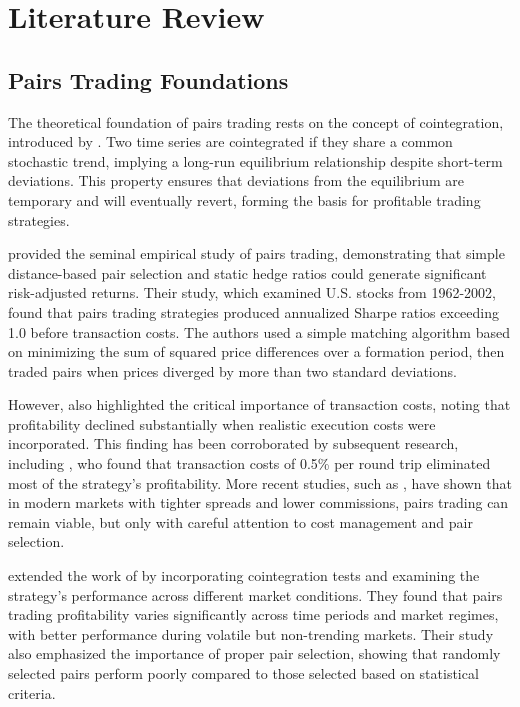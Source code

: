 \documentclass[12pt]{article}
\begin{document}
\section{Literature Review}

\subsection{Pairs Trading Foundations}

The theoretical foundation of pairs trading rests on the concept of cointegration, introduced by \citet{engle1987cointegration}. Two time series are cointegrated if they share a common stochastic trend, implying a long-run equilibrium relationship despite short-term deviations. This property ensures that deviations from the equilibrium are temporary and will eventually revert, forming the basis for profitable trading strategies.

\citet{gatev2006pairs} provided the seminal empirical study of pairs trading, demonstrating that simple distance-based pair selection and static hedge ratios could generate significant risk-adjusted returns. Their study, which examined U.S. stocks from 1962-2002, found that pairs trading strategies produced annualized Sharpe ratios exceeding 1.0 before transaction costs. The authors used a simple matching algorithm based on minimizing the sum of squared price differences over a formation period, then traded pairs when prices diverged by more than two standard deviations.

However, \citet{gatev2006pairs} also highlighted the critical importance of transaction costs, noting that profitability declined substantially when realistic execution costs were incorporated. This finding has been corroborated by subsequent research, including \citet{do2006pairs}, who found that transaction costs of 0.5\% per round trip eliminated most of the strategy's profitability. More recent studies, such as \citet{rad2016pairs}, have shown that in modern markets with tighter spreads and lower commissions, pairs trading can remain viable, but only with careful attention to cost management and pair selection.

\citet{do2006pairs} extended the work of \citet{gatev2006pairs} by incorporating cointegration tests and examining the strategy's performance across different market conditions. They found that pairs trading profitability varies significantly across time periods and market regimes, with better performance during volatile but non-trending markets. Their study also emphasized the importance of proper pair selection, showing that randomly selected pairs perform poorly compared to those selected based on statistical criteria.
\end{document}
